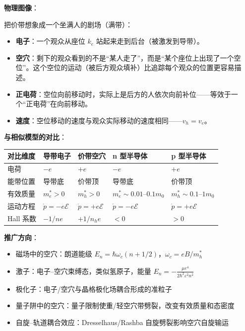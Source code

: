 \begin{insightbox}[物理图像与模型关联]
\textbf{物理图像}：

把价带想象成一个坐满人的剧场（满带）：
\begin{itemize}[nosep]
    \item \textbf{电子}：一个观众从座位 $k_e$ 站起来走到后台（被激发到导带）。
    \item \textbf{空穴}：剩下的观众看到的不是``某人走了''，而是``某个座位上出现了一个空位''。这个空位的运动（被后方观众填补）比追踪每个观众的位置更容易描述。
    \item \textbf{正电荷}：空位向前移动时，实际上是后方的人依次向前补位——等效于一个``正电荷''在向前移动。
    \item \textbf{速度}：空位移动的速度与观众实际移动的速度相同——$v_h=v_e$。
\end{itemize}

\textbf{与相似模型的对比}：
\begin{center}
\begin{tabular}{lllll}
\toprule
\textbf{对比维度} & \textbf{导带电子} & \textbf{价带空穴} & \textbf{n 型半导体} & \textbf{p 型半导体} \\
\midrule
电荷 & $-e$ & $+e$ & $-e$ & $+e$ \\
能带位置 & 导带底 & 价带顶 & 导带底 & 价带顶 \\
有效质量 & $m_e^*>0$ & $m_h^*>0$ & $m_e^*\sim0.01$--$0.1m_0$ & $m_h^*\sim0.1$--$1m_0$ \\
运动方程 & $\dot{p}=-e\mathcal{E}$ & $\dot{p}=+e\mathcal{E}$ & $\dot{p}=-e\mathcal{E}$ & $\dot{p}=+e\mathcal{E}$ \\
Hall 系数 & $-1/ne$ & $+1/n_h e$ & $<0$ & $>0$ \\
\bottomrule
\end{tabular}
\end{center}

\textbf{推广方向}：
\begin{itemize}[nosep]
    \item 磁场中的空穴：朗道能级 $E_n=\hbar\omega_c(n+1/2)$，$\omega_c=eB/m_h^*$
    \item 激子：电子--空穴束缚态，类似氢原子，能量 $E_n=-\frac{\mu e^4}{2\hbar^2\varepsilon^2n^2}$
    \item 极化子：电子/空穴与晶格极化场耦合形成的准粒子
    \item 量子阱中的空穴：量子限制使重/轻空穴带劈裂，改变有效质量和态密度
    \item 自旋--轨道耦合效应：Dresselhaus/Rashba 自旋劈裂影响空穴自旋输运
\end{itemize}
\end{insightbox}

